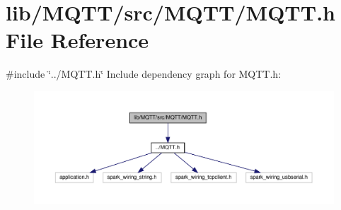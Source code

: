 \section{lib/\+M\+Q\+T\+T/src/\+M\+Q\+T\+T/\+M\+Q\+TT.h File Reference}
\label{_m_q_t_t_2_m_q_t_t_8h}
{\ttfamily \#include \char`\"{}../\+M\+Q\+T\+T.\+h\char`\"{}}\newline
Include dependency graph for M\+Q\+T\+T.\+h\+:\nopagebreak
\begin{figure}[H]
\begin{center}
\leavevmode
\includegraphics[width=350pt]{_m_q_t_t_2_m_q_t_t_8h__incl}
\end{center}
\end{figure}
